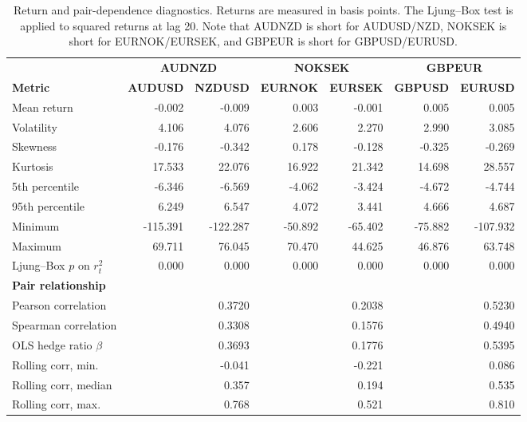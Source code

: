 \begin{table}[H]
\centering
\caption{Return and pair-dependence diagnostics. Returns are measured in basis points. The Ljung--Box test is applied to squared returns at lag 20. Note that AUDNZD is short for AUDUSD/NZD, NOKSEK is short for EURNOK/EURSEK, and GBPEUR is short for GBPUSD/EURUSD.}
\label{tab:dependence_all_pairs}
\scriptsize
\begin{tabularx}{\linewidth}{Xrrrrrr}
\toprule
& \multicolumn{2}{c}{\textbf{AUDNZD}}
& \multicolumn{2}{c}{\textbf{NOKSEK}}
& \multicolumn{2}{c}{\textbf{GBPEUR}} \\
\cmidrule(lr){2-3}
\cmidrule(lr){4-5}
\cmidrule(lr){6-7}
\textbf{Metric} & \textbf{AUDUSD} & \textbf{NZDUSD} & \textbf{EURNOK} & \textbf{EURSEK} & \textbf{GBPUSD} & \textbf{EURUSD} \\
\midrule
Mean return & -0.002 & -0.009 & 0.003 & -0.001 & 0.005 & 0.005 \\
Volatility & 4.106 & 4.076 & 2.606 & 2.270 & 2.990 & 3.085 \\
Skewness & -0.176 & -0.342 & 0.178 & -0.128 & -0.325 & -0.269 \\
Kurtosis & 17.533 & 22.076 & 16.922 & 21.342 & 14.698 & 28.557 \\
5th percentile & -6.346 & -6.569 & -4.062 & -3.424 & -4.672 & -4.744 \\
95th percentile & 6.249 & 6.547 & 4.072 & 3.441 & 4.666 & 4.687 \\
Minimum & -115.391 & -122.287 & -50.892 & -65.402 & -75.882 & -107.932 \\
Maximum & 69.711 & 76.045 & 70.470 & 44.625 & 46.876 & 63.748 \\
Ljung--Box $p$ on $r_t^2$ & 0.000 & 0.000 & 0.000 & 0.000 & 0.000 & 0.000 \\
\midrule
\multicolumn{7}{l}{\textbf{Pair relationship}} \\
\midrule
Pearson correlation & \multicolumn{2}{r}{0.3720} & \multicolumn{2}{r}{0.2038} & \multicolumn{2}{r}{0.5230} \\
Spearman correlation & \multicolumn{2}{r}{0.3308} & \multicolumn{2}{r}{0.1576} & \multicolumn{2}{r}{0.4940} \\
OLS hedge ratio $\beta$ & \multicolumn{2}{r}{0.3693} & \multicolumn{2}{r}{0.1776} & \multicolumn{2}{r}{0.5395} \\
Rolling corr, min. & \multicolumn{2}{r}{-0.041} & \multicolumn{2}{r}{-0.221} & \multicolumn{2}{r}{0.086} \\
Rolling corr, median & \multicolumn{2}{r}{0.357} & \multicolumn{2}{r}{0.194} & \multicolumn{2}{r}{0.535} \\
Rolling corr, max. & \multicolumn{2}{r}{0.768} & \multicolumn{2}{r}{0.521} & \multicolumn{2}{r}{0.810} \\
\bottomrule
\end{tabularx}
\end{table}

